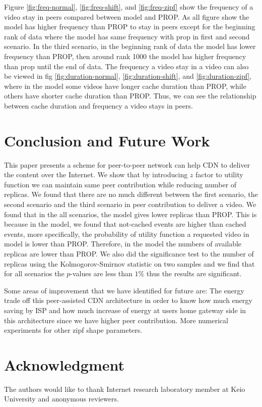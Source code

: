 \documentclass[10pt,final,journal,a4paper]{IEEEtran}
\begin{document}
Figure \ref{fig:freq-normal}, \ref{fig:freq-shift}, and \ref{fig:freq-zipf} show the frequency of a video stay in peers compared between model and PROP.
As all figure show the model has higher frequency than PROP to stay in peers except for the beginning rank of data where the model has same frequency with prop in first and second scenario. 
In the third scenario, in the beginning rank of data the model has lower frequency than PROP, then around rank 1000 the model has higher frequency than prop until the end of data. 
The frequency a video stay in a video can also be viewed in fig \ref{fig:duration-normal},  \ref{fig:duration-shift}, and \ref{fig:duration-zipf}, where in the model some videos have longer cache duration than PROP, while others have shorter cache duration than PROP.  
Thus, we can see the relationship between cache duration and frequency a video stays in peers. 

\section{Conclusion and Future Work}\label{conclusion}
This paper presents a scheme for peer-to-peer network can help CDN to deliver the content over the Internet. 
We show that by introducing $z$ factor to utility function we can maintain same peer contribution while reducing number of replicas.
We found that there are no much different between the first scenario, the second scenario and the third scenario in peer contribution to deliver a video. 
We found that in the all scenarios, the model gives lower replicas than PROP. 
This is because in the model, we found that not-cached events are higher than cached events, more specifically, the probability of utility function a requested video in model is lower than PROP.
Therefore, in the model the numbers of available replicas are lower than PROP. 
We also did the significance test to the number of replicas using the Kolmogorov-Smirnov statistic on two samples and we find that for all scenarios the $p$-values are less than $1$\% thus the results are significant. 

Some areas of improvement that we have identified for future are:
The energy trade off this peer-assisted CDN architecture in order to know how much energy saving by ISP and how much increase of energy at users home gateway side in this architecture since we have higher peer contribution.   
More numerical experiments for other zipf shape parameters. 


\section*{Acknowledgment}
The authors would like to thank Internet research laboratory member at Keio University and anonymous reviewers.
\end{document}
